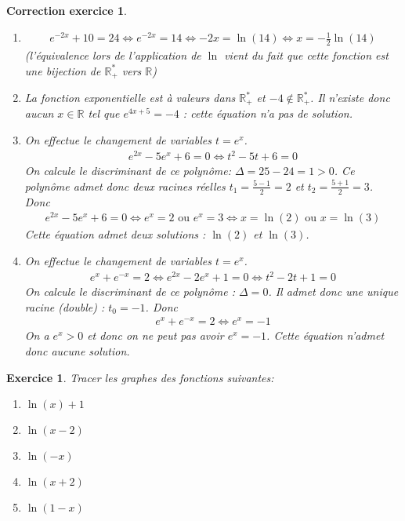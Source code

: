 \documentclass[12pt]{article}
\newtheorem{exercice}{\bf Exercice}
\newtheorem{correction}{\bf Correction exercice}
\newenvironment{exo}{
  \begin{exercice}\normalfont}{\end{exercice}
}
\newenvironment{cor}{
\begin{correction}\smallskip\normalfont}{\end{correction}
}
\newcommand*{\R}{\mathbb{R}}
\begin{document}
\begin{cor}
\begin{enumerate}
\item
  \begin{align*}
    e^{-2x} + 10 = 24
    \iff
    e^{-2x} = 14
    \iff
    -2x = \ln(14)
    \iff
    x = - \frac12 \ln(14)
  \end{align*}
  (l'\'equivalence lors de l'application de $\ln$ vient du fait que cette fonction
  est une bijection de $\R_+^*$ vers $\R$)

\item La fonction exponentielle est \`a valeurs dans $\R_+^*$ et $-4 \notin \R_+^*$.
  Il n'existe donc aucun $x \in \R$ tel que $e^{4x+5} = -4$ : cette \'equation n'a pas de solution.

\item On effectue le changement de variables $t = e^x$.
  \begin{align*}
    e^{2x} - 5 e^{x} + 6 = 0
    \iff
    t^2 - 5 t + 6 = 0
  \end{align*}
  On calcule le discriminant de ce polyn\^ome:
  $\Delta = 25 - 24 = 1 > 0$.
  Ce polyn\^ome admet donc deux racines r\'eelles
  $t_1 = \frac{5-1}{2} = 2$ et $t_2 = \frac{5+1}{2} = 3$.
  Donc 
  \begin{align*}
    e^{2x} - 5 e^{x} + 6 = 0
    \iff
    e^x = 2 \text{  ou  } e^x = 3
    \iff
    x = \ln(2) \text{  ou  } x = \ln(3)
  \end{align*}
  Cette \'equation admet deux solutions : $\ln(2)$ et $\ln(3)$.
\item On effectue le changement de variables $t = e^x$.
  \begin{align*}
    e^x + e^{-x} = 2
    \iff
    e^{2x} - 2 e^x + 1 = 0
    \iff
    t^2 - 2 t + 1 = 0
  \end{align*}
  On calcule le discriminant de ce polyn\^ome :
  $\Delta = 0$. Il admet donc une unique racine (double) : $t_0 = -1$.
  Donc
  \begin{align*}
    e^x + e^{-x} = 2
    \iff
    e^x = -1
  \end{align*}
  On a $e^x > 0$ et donc on ne peut pas avoir $e^x = -1$.
  Cette \'equation n'admet donc aucune solution.
\end{enumerate}
\end{cor}
\color{black}
\fi


\begin{exo} Tracer les graphes des fonctions suivantes:
\begin{multicols}{5}
\begin{enumerate}
\item $\ln(x)+1$
\item $\ln(x-2)$
\item $\ln(-x)$
\item $\ln(x+2)$
\item $\ln(1-x)$
\end{enumerate}
\end{multicols}
\end{exo}
\end{document}
